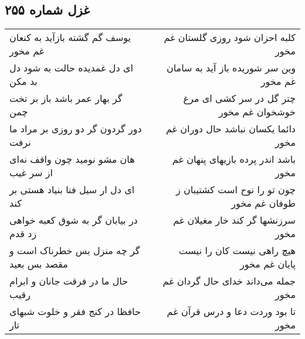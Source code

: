 \begin{center}
\section*{غزل شماره ۲۵۵}
\label{sec:sh255}
\begin{longtable}{l p{0.5cm} r}
یوسف گم گشته بازآید به کنعان غم مخور
&&
کلبه احزان شود روزی گلستان غم مخور
\\
ای دل غمدیده حالت به شود دل بد مکن
&&
وین سر شوریده باز آید به سامان غم مخور
\\
گر بهار عمر باشد باز بر تخت چمن
&&
چتر گل در سر کشی ای مرغ خوشخوان غم مخور
\\
دور گردون گر دو روزی بر مراد ما نرفت 
&&
دائما یکسان نباشد حال دوران غم مخور
\\
هان مشو نومید چون واقف نه‌ای از سر غیب
&&
باشد اندر پرده بازیهای پنهان غم مخور
\\
ای دل ار سیل فنا بنیاد هستی بر کند
&&
چون تو را نوح است کشتیبان ز طوفان غم مخور
\\
در بیابان گر به شوق کعبه خواهی زد قدم
&&
سرزنشها گر کند خار مغیلان غم مخور
\\
گر چه منزل بس خطرناک است و مقصد بس بعید
&&
هیچ راهی نیست کان را نیست پایان غم مخور
\\
حال ما در فرقت جانان و ابرام رقیب
&&
جمله می‌داند خدای حال گردان غم مخور
\\
حافظا در کنج فقر و خلوت شبهای تار
&&
تا بود وردت دعا و درس قرآن غم مخور
\\
\end{longtable}
\end{center}
